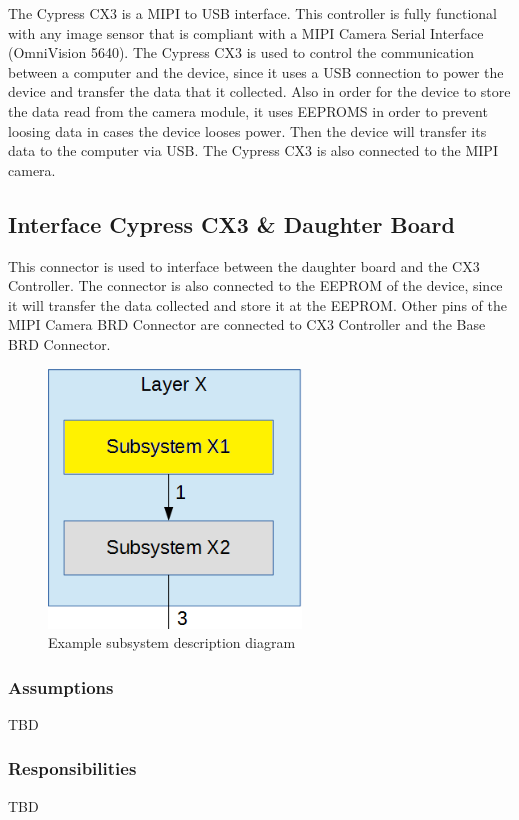 The Cypress CX3 is a MIPI to USB interface. This controller is fully functional with any image sensor that is compliant with a MIPI Camera Serial Interface (OmniVision 5640). The Cypress CX3 is used to control the communication between a computer and the device, since it uses a USB connection to power the device and transfer the data that it collected. Also in order for the device to store the data read from the camera module, it uses EEPROMS in order to prevent loosing data in cases the device looses power. Then the device will transfer its data to the computer via USB. The Cypress CX3 is also connected to the MIPI camera.

\subsection{Interface Cypress CX3 & Daughter Board}
This connector is used to interface between the daughter board and the CX3 Controller. The connector is also connected to the EEPROM of the device, since it will transfer the data collected and store it at the EEPROM. Other pins of the MIPI Camera BRD Connector are connected to CX3 Controller and the Base BRD Connector.

\begin{figure}[h!]
	\centering
 	\includegraphics[width=0.60\textwidth]{images/subsystem}
 \caption{Example subsystem description diagram}
\end{figure}

\subsubsection{Assumptions}
TBD

\subsubsection{Responsibilities}
TBD


